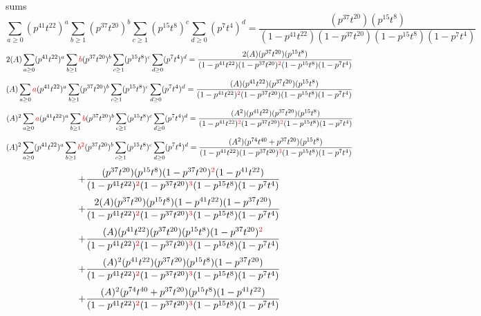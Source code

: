 \documentclass{article}
\begin{document}
sums\[\sum_{a\geq{0}}(p^{41}t^{22})^{a}\sum_{b\geq{1}}(p^{37}t^{20})^{b}\sum_{c\geq{1}}(p^{15}t^{8})^{c}\sum_{d\geq{0}}(p^{7}t^{4})^{d}=\frac{(p^{37}t^{20})(p^{15}t^{8})}{(1-p^{41}t^{22})(1-p^{37}t^{20})(1-p^{15}t^{8})(1-p^{7}t^{4})}\]\[2(A)\sum_{a\geq{0}}(p^{41}t^{22})^{a}\sum_{b\geq{1}}\textcolor{red}{b}(p^{37}t^{20})^{b}\sum_{c\geq{1}}(p^{15}t^{8})^{c}\sum_{d\geq{0}}(p^{7}t^{4})^{d}=\frac{2(A)(p^{37}t^{20})(p^{15}t^{8})}{(1-p^{41}t^{22})(1-p^{37}t^{20})^{\textcolor{red}{2}}(1-p^{15}t^{8})(1-p^{7}t^{4})}\]\[(A)\sum_{a\geq{0}}\textcolor{red}{a}(p^{41}t^{22})^{a}\sum_{b\geq{1}}(p^{37}t^{20})^{b}\sum_{c\geq{1}}(p^{15}t^{8})^{c}\sum_{d\geq{0}}(p^{7}t^{4})^{d}=\frac{(A)(p^{41}t^{22})(p^{37}t^{20})(p^{15}t^{8})}{(1-p^{41}t^{22})^{\textcolor{red}{2}}(1-p^{37}t^{20})(1-p^{15}t^{8})(1-p^{7}t^{4})}\]\[(A)^{2}\sum_{a\geq{0}}\textcolor{red}{a}(p^{41}t^{22})^{a}\sum_{b\geq{1}}\textcolor{red}{b}(p^{37}t^{20})^{b}\sum_{c\geq{1}}(p^{15}t^{8})^{c}\sum_{d\geq{0}}(p^{7}t^{4})^{d}=\frac{(A^{2})(p^{41}t^{22})(p^{37}t^{20})(p^{15}t^{8})}{(1-p^{41}t^{22})^{\textcolor{red}{2}}(1-p^{37}t^{20})^{\textcolor{red}{2}}(1-p^{15}t^{8})(1-p^{7}t^{4})}\]\[(A)^{2}\sum_{a\geq{0}}(p^{41}t^{22})^{a}\sum_{b\geq{1}}\textcolor{red}{b^{2}}(p^{37}t^{20})^{b}\sum_{c\geq{1}}(p^{15}t^{8})^{c}\sum_{d\geq{0}}(p^{7}t^{4})^{d}=\frac{(A^{2})(p^{74}t^{40}+p^{37}t^{20})(p^{15}t^{8})}{(1-p^{41}t^{22})(1-p^{37}t^{20})^{\textcolor{red}{3}}(1-p^{15}t^{8})(1-p^{7}t^{4})}\]\[+\frac{(p^{37}t^{20})(p^{15}t^{8})(1-p^{37}t^{20})^{\textcolor{red}{2}}(1-p^{41}t^{22})}{(1-p^{41}t^{22})^{\textcolor{red}{2}}(1-p^{37}t^{20})^{\textcolor{red}{3}}(1-p^{15}t^{8})(1-p^{7}t^{4})}\]\[+\frac{2(A)(p^{37}t^{20})(p^{15}t^{8})(1-p^{41}t^{22})(1-p^{37}t^{20})}{(1-p^{41}t^{22})^{\textcolor{red}{2}}(1-p^{37}t^{20})^{\textcolor{red}{3}}(1-p^{15}t^{8})(1-p^{7}t^{4})}\]\[+\frac{(A)(p^{41}t^{22})(p^{37}t^{20})(p^{15}t^{8})(1-p^{37}t^{20})^{\textcolor{red}{2}}}{(1-p^{41}t^{22})^{\textcolor{red}{2}}(1-p^{37}t^{20})^{\textcolor{red}{3}}(1-p^{15}t^{8})(1-p^{7}t^{4})}\]\[+\frac{(A)^{2}(p^{41}t^{22})(p^{37}t^{20})(p^{15}t^{8})(1-p^{37}t^{20})}{(1-p^{41}t^{22})^{\textcolor{red}{2}}(1-p^{37}t^{20})^{\textcolor{red}{3}}(1-p^{15}t^{8})(1-p^{7}t^{4})}\]\[+\frac{(A)^{2}(p^{74}t^{40}+p^{37}t^{20})(p^{15}t^{8})(1-p^{41}t^{22})}{(1-p^{41}t^{22})^{\textcolor{red}{2}}(1-p^{37}t^{20})^{\textcolor{red}{3}}(1-p^{15}t^{8})(1-p^{7}t^{4})}\]
\end{document}
